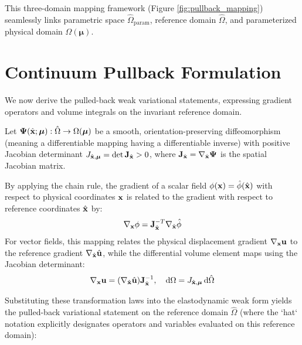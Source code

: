 This three-domain mapping framework (Figure \ref{fig:pullback_mapping}) seamlessly links parametric space $\hat{\Omega}_{\text{param}}$, reference domain $\hat{\Omega}$, and parameterized physical domain $\Omega(\boldsymbol{\mu})$.
\newpage
\section{Continuum Pullback Formulation}

We now derive the pulled-back weak variational statements, expressing gradient operators and volume integrals on the invariant reference domain.

Let $\boldsymbol{\Psi}(\hat{\mathbf{x}}; \boldsymbol{\mu}) : \hat{\Omega} \to \Omega(\boldsymbol{\mu})$ be a smooth, orientation-preserving diffeomorphism (meaning a differentiable mapping having a differentiable inverse) with positive Jacobian determinant $J_{\hat{\mathbf{x}}, \boldsymbol{\mu}} = \det \mathbf{J}_{\hat{\mathbf{x}}} > 0$, where $\mathbf{J}_{\hat{\mathbf{x}}} = \nabla_{\hat{\mathbf{x}}} \boldsymbol{\Psi}$ is the spatial Jacobian matrix. 

By applying the chain rule, the gradient of a scalar field $\phi(\mathbf{x}) = \hat{\phi}(\hat{\mathbf{x}})$ with respect to physical coordinates $\mathbf{x}$ is related to the gradient with respect to reference coordinates $\hat{\mathbf{x}}$ by:
\begin{equation}
    \nabla_{\mathbf{x}} \phi = \mathbf{J}_{\hat{\mathbf{x}}}^{-T} \nabla_{\hat{\mathbf{x}}} \hat{\phi}
\end{equation}
For vector fields, this mapping relates the physical displacement gradient $\nabla_{\mathbf{x}} \mathbf{u}$ to the reference gradient $\nabla_{\hat{\mathbf{x}}} \hat{\mathbf{u}}$, while the differential volume element maps using the Jacobian determinant:
\begin{equation}
    \nabla_{\mathbf{x}} \mathbf{u} = (\nabla_{\hat{\mathbf{x}}} \hat{\mathbf{u}}) \mathbf{J}_{\hat{\mathbf{x}}}^{-1}, \quad \mathrm{d}\Omega = J_{\hat{\mathbf{x}}, \boldsymbol{\mu}} \, \mathrm{d}\hat{\Omega}
\end{equation}

Substituting these transformation laws into the elastodynamic weak form yields the pulled-back variational statement on the reference domain $\hat{\Omega}$ (where the `hat` notation explicitly designates operators and variables evaluated on this reference domain):

